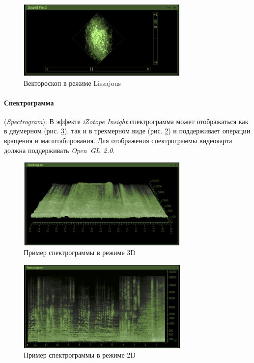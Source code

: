 \documentclass[oneside, final, 14pt]{extreport}
\begin{document}
\begin{figure}[h!]
\centering
\includegraphics[width=0.75\textwidth]{pic-insight-11}
\caption{Вектороскоп в режиме Lissajous}
\label{pic-insight-10}
\end{figure}

\paragraph{Спектрограмма} (\textit{Spectrogram}). В эффекте \textit{iZotope Insight} спектрограмма может отображаться как в двумерном (рис. \ref{pic-insight-13}), так и в трехмерном виде (рис. \ref{pic-insight-12}) и поддерживает операции вращения и масштабирования. Для отображения спектрограммы видеокарта должна поддерживать \textit{Open~GL~2.0}.

\begin{figure}[h!]
\centering
\includegraphics[width=0.75\textwidth]{pic-insight-12}
\caption{Пример спектрограммы в режиме 3D}
\label{pic-insight-12}
\end{figure}

\begin{figure}[h!]
\centering
\includegraphics[width=0.75\textwidth]{pic-insight-13}
\caption{Пример спектрограммы в режиме 2D}
\label{pic-insight-13}
\end{figure}
\end{document}
